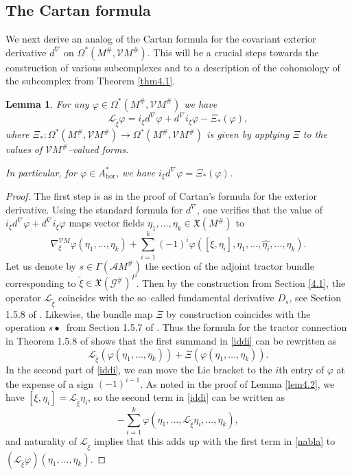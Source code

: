 \documentclass[12pt,a4paper]{amsart}
\def\frak{\mathfrak}
\def\Cal{\mathcal}
\let\phi\varphi
\newcommand{\ph}{\phi}
\newcommand{\Ga}{\Gamma}
\newcommand{\Om}{\Omega}
\newcommand{\hor}{\text{hor}}
\newcounter{theorem}
\numberwithin{theorem}{section}
\newtheorem{lemma}[theorem]{Lemma}
\theoremstyle{definition}
\theoremstyle{remark}
\begin{document}
\subsection{The Cartan formula}\label{4.3}
We next derive an analog of the Cartan formula for the covariant
exterior derivative $d^\nabla$ on $\Om^*(M^\#,\Cal VM^\#)$. This will
be a crucial steps towards the construction of various subcomplexes
and to a description of the cohomology of the subcomplex from Theorem
\ref{thm4.1}. 

\begin{lemma}\label{lem4.3}
For any $\ph\in\Om^*(M^\#,\Cal VM^\#)$ we have 
$$
\Cal L_{\tilde\xi}\ph=i_\xi d^\nabla\ph+d^\nabla
i_\xi\ph-\Xi_*(\ph), 
$$
where $\Xi_*:\Om^*(M^\#,\Cal VM^\#)\to\Om^*(M^\#,\Cal VM^\#)$ is given
by applying $\Xi$ to the values of $\Cal VM^\#$--valued forms.  

In particular, for $\ph\in A^*_\hor$, we have $i_\xi
d^\nabla\ph=\Xi_*(\ph)$. 
\end{lemma}
\begin{proof}
The first step is as in the proof of Cartan's formula for the exterior
derivative. Using the standard formula for $d^\nabla$, one verifies
that the value of $i_\xi d^\nabla\ph+d^\nabla i_\xi\ph$ maps vector
fields $\eta_1,\dots,\eta_k\in\frak X(M^\#)$ to
\begin{equation}\label{iddi}
\nabla^{\Cal VM}_\xi\ph(\eta_1,\dots,\eta_k)+\textstyle\sum_{i=1}^k(-1)^{i}
\ph([\xi,\eta_i],\eta_1,\dots,\widehat{\eta_i},\dots,\eta_k).
\end{equation}
Let us denote by $s\in\Ga(\Cal AM^\#)$ the section of the adjoint
tractor bundle corresponding to $\tilde\xi\in\frak X(\Cal
G^\#)^P$. Then by the construction from Section \ref{4.1}, the
operator $\Cal L_{\tilde\xi}$ coincides with the so--called
fundamental derivative $D_s$, see Section 1.5.8 of
\cite{book}. Likewise, the bundle map $\Xi$ by construction coincides
with the operation $s\bullet\ $ from Section 1.5.7 of
\cite{book}. Thus the formula for the tractor connection in Theorem
1.5.8 of \cite{book} shows that the first summand in \eqref{iddi} can
be rewritten as
\begin{equation}\label{nabla}
\Cal L_{\tilde\xi}(\ph(\eta_1,\dots,\eta_k))+
\Xi(\ph(\eta_1,\dots,\eta_k)). 
\end{equation}
In the second part of \eqref{iddi}, we can move the Lie bracket to the
$i$th entry of $\ph$ at the expense of a sign $(-1)^{i-1}$. As noted
in the proof of Lemma \ref{lem4.2}, we have $[\xi,\eta_i]=\Cal
L_{\tilde\xi}\eta_i$, so the second term in \eqref{iddi} can be
written as 
$$
-\textstyle\sum_{i=1}^k\ph(\eta_1,\dots,\Cal
L_{\tilde\xi}\eta_i,\dots,\eta_k), 
$$
and naturality of $\Cal L_{\tilde\xi}$ implies that this adds up with
the first term in \eqref{nabla} to $(\Cal
L_{\tilde\xi}\ph)(\eta_1,\dots,\eta_k)$. 
\end{proof}
\end{document}
